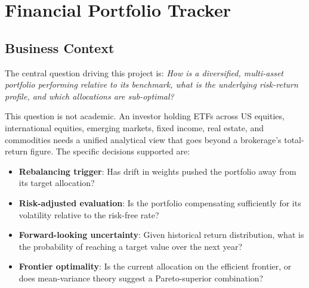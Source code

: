 \chapter{Financial Portfolio Tracker}
\label{ch:portfolio}


\section{Business Context}
\label{sec:portfolio-business}

The central question driving this project is: \textit{How is a diversified, multi-asset portfolio performing relative to its benchmark, what is the underlying risk-return profile, and which allocations are sub-optimal?}

This question is not academic. An investor holding ETFs across US equities, international equities, emerging markets, fixed income, real estate, and commodities needs a unified analytical view that goes beyond a brokerage's total-return figure. The specific decisions supported are:

\begin{itemize}
  \item \textbf{Rebalancing trigger}: Has drift in weights pushed the portfolio away from its target allocation?
  \item \textbf{Risk-adjusted evaluation}: Is the portfolio compensating sufficiently for its volatility relative to the risk-free rate?
  \item \textbf{Forward-looking uncertainty}: Given historical return distribution, what is the probability of reaching a target value over the next year?
  \item \textbf{Frontier optimality}: Is the current allocation on the efficient frontier, or does mean-variance theory suggest a Pareto-superior combination?
\end{itemize}

